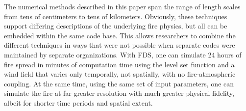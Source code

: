 \documentclass[journal,article,atmosphere,submit,moreauthors,pdftex]{Definitions/mdpi}
\begin{document}
The numerical methods described in this paper span the range of length scales from tens of centimeters to tens of kilometers. Obviously, these techniques support differing descriptions of the underlying fire physics, but all can be embedded within the same code base. This allows researchers to combine the different techniques in ways that were not possible when separate codes were maintained by separate organizations. With FDS, one can simulate 24 hours of fire spread in minutes of computation time using the level set function and a wind field that varies only temporally, not spatially, with no fire-atmospheric coupling. At the same time, using the same set of input parameters, one can simulate the fire at far greater resolution with much greater physical fidelity, albeit for shorter time periods and spatial extent.















\end{document}
